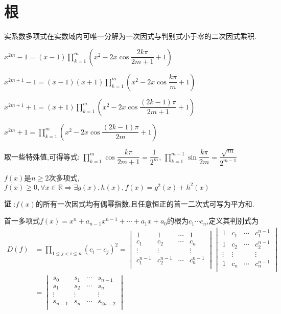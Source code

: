 \section{根}
实系数多项式在实数域内可唯一分解为一次因式与判别式小于零的二次因式乘积.

$ x^{2m}-1=(x-1) \prod_{k=1}^m{( x^2-2x\cos\dfrac{2k\pi}{2m+1}+1 )}$

$ x^{2m+1}-1 =(x-1)(x+1)\prod_{k=1}^m{(x^2-2x\cos\dfrac{k\pi}{m}+1)}$ 

$ x^{2m+1}+1=(x+1)\prod_{k=1}^m{( x^2-2x\cos\dfrac{(2k-1)\pi}{2m+1}+1 )}$

$ x^{2m}+1=\prod_{k=1}^m{(x^2-2x\cos\dfrac{(2k-1)\pi}{2m}+1)}$

取一些特殊值,可得等式:
$ \prod_{k=1}^m{\cos\dfrac{k\pi}{2m+1}}=\dfrac{1}{2^m}$,
$ \prod_{k=1}^{m-1}{\sin\dfrac{k\pi}{2m}}=\dfrac{\sqrt{m}}{2^{m-1}}$


$ f(x)$是$ n\ge2$次多项式,$ f(x)\ge 0,\forall x\in \mathbb{R}\Rightarrow \exists g(x),h(x),f(x)=g^2(x)+h^2(x)$

{\bf 证 }:$ f(x)$的所有一次因式均有偶幂指数,且任意恒正的首一二次式可写为平方和.

首一多项式$ f(x)=x^n+a_{n-1}x^{n-1}+\cdots+a_1x+a_0$的根为$ c_1\cdots c_n$,定义其判别式为
\[ \begin{aligned}
	D(f) & =\prod_{1\le j< i\le n}{(c_i-c_j)^2}=
		\begin{vmatrix} 
		1 & 1 & \cdots & 1\\
		c_1 & c_2 & \cdots & c_n \\
		\vdots & \vdots & & \vdots \\
		c_1^{n-1} & c_2^{n-1} & \cdots & c_n^{n-1}\\
		\end{vmatrix}
		\begin{vmatrix}
		1 & c_1 & \cdots & c_1^{n-1}\\
		1 & c_2 & \cdots & c_2^{n-1}\\
		\vdots & \vdots & & \vdots \\
		1 & c_n & \cdots & c_n^{n-1}\\
		\end{vmatrix} \\
		& = \begin{vmatrix}
			s_0 & s_1 & \cdots & s_{n-1}\\
			s_1 & s_2 & \cdots & s_{n}\\
			\vdots & \vdots & & \vdots \\
			s_{n-1} & s_{n} & \cdots & s_{2n-2}\\
			\end{vmatrix}
\end{aligned} \]

